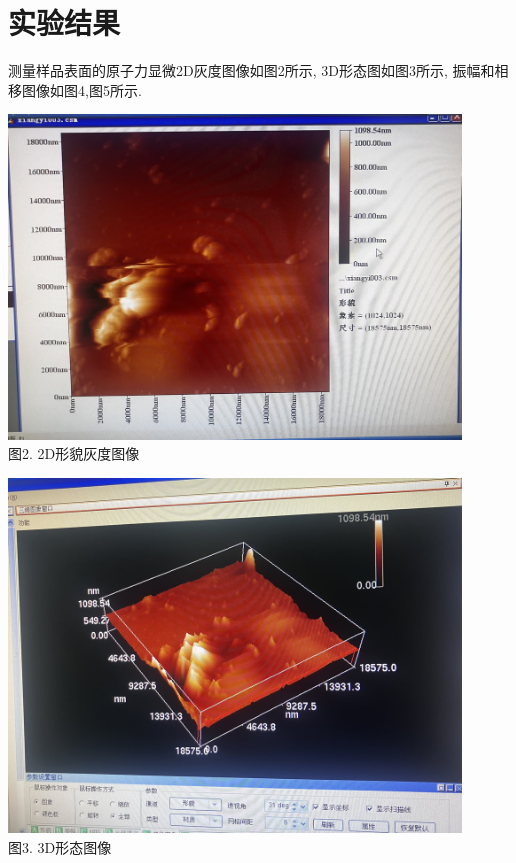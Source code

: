 \documentclass[UTF8]{ctexart}
\begin{document}
\section{实验结果}
测量样品表面的原子力显微2D灰度图像如图2所示, 3D形态图如图3所示, 振幅和相移图像如图4,图5所示.\\
\begin{minipage}[!ht]{0.5\linewidth}
    \centering
    \includegraphics[width=0.9\textwidth]{2.JPG}\\
    {\small{
        图2. 2D形貌灰度图像
    }}
    \vspace{10pt}
\end{minipage}
\begin{minipage}[!ht]{0.5\linewidth}
    \centering
    \includegraphics[width=0.9\textwidth]{3.JPG}\\
    {\small{
        图3. 3D形态图像
    }}
    \vspace{10pt}
\end{minipage}\\
\end{document}

